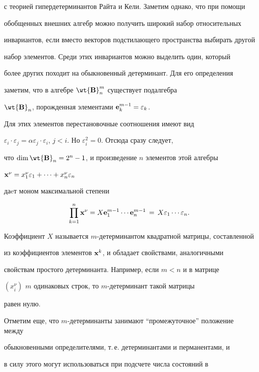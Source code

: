 с теорией гипердетерминантов Райта и Кели. Заметим однако, что при помощи


обобщенных внешних алгебр можно получить широкий набор относительных


инвариантов, если вместо векторов подстилающего пространства выбирать другой


набор элементов. Среди этих инвариантов можно выделить один, который


более других походит на обыкновенный детерминант. Для его определения


заметим, что в алгебре $\wt{\bold B}_n^m$ существует подалгебра


$\wt{\bold B}_n$, порожденная элементами ${\bold e}_k^{m-1}=\varepsilon_k$.


Для этих элементов перестановочные соотношения имеют вид


$\varepsilon_i \cdot \varepsilon_j = \alpha \varepsilon_j \cdot


\varepsilon_i$, $j<i$. Но $\varepsilon_i^2 = 0$. Отсюда сразу следует,


что $\dim\wt{\bold B}_n= 2^n-1$, и произведение $n$ элементов этой алгебры


${\bold x}^{\nu}=x_1^{\nu}\varepsilon_1 +\dotsb +x_n^{\nu}\varepsilon_n$


даeт моном максимальной степени


$$


\prod_{k=1}^n {\bold x}^{\nu}= X{\bold e}^{m-1}_1\dotsb


{\bold e}^{m-1}_n\,=\, X\varepsilon_1\dotsb\varepsilon_n.


$$


Коэффициент $X$ называется $m$-детерминантом квадратной матрицы, составленной


из коэффициентов элементов ${\bold x}^k$, и обладает свойствами, аналогичными


свойствам простого детерминанта. Например, если $m<n$ и в матрице


$(x^{\nu}_i)$\; $m$ одинаковых строк, то $m$-детерминант такой матрицы


равен нулю.





Отметим еще, что $m$-детерминанты занимают ``промежуточное'' положение между


обыкновенными определителями, т.\,е. детерминантами и перманентами, и


в силу этого могут использоваться при подсчете числа состояний в


